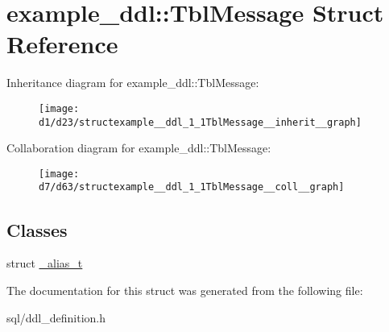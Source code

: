 \hypertarget{structexample__ddl_1_1TblMessage}{}\section{example\+\_\+ddl\+:\+:Tbl\+Message Struct Reference}
\label{structexample__ddl_1_1TblMessage}


Inheritance diagram for example\+\_\+ddl\+:\+:Tbl\+Message\+:
\nopagebreak
\begin{figure}[H]
\begin{center}
\leavevmode
\texttt{[image: d1/d23/structexample\_\_ddl\_1\_1TblMessage\_\_inherit\_\_graph]}
\end{center}
\end{figure}


Collaboration diagram for example\+\_\+ddl\+:\+:Tbl\+Message\+:
\nopagebreak
\begin{figure}[H]
\begin{center}
\leavevmode
\texttt{[image: d7/d63/structexample\_\_ddl\_1\_1TblMessage\_\_coll\_\_graph]}
\end{center}
\end{figure}
\subsection*{Classes}
\begin{DoxyCompactItemize}
\item 
struct \hyperlink{structexample__ddl_1_1TblMessage_1_1__alias__t}{\+\_\+alias\+\_\+t}
\end{DoxyCompactItemize}


The documentation for this struct was generated from the following file\+:\begin{DoxyCompactItemize}
\item 
sql/ddl\+\_\+definition.\+h\end{DoxyCompactItemize}

